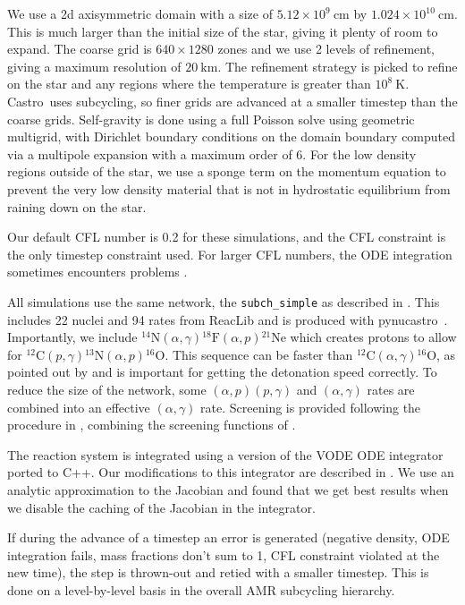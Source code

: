 \documentclass[modern]{aastex631}
\newcommand{\isotm}[2]{{}^{#2}\mathrm{#1}}
\newcommand{\castro}{{\sf Castro}}
\newcommand{\pynucastro}{{\sf pynucastro}}
\newcommand{\MarginPar}[1]{
    \marginpar{\vskip-\baselineskip%
               \raggedright%
               \tiny\sffamily%
               {\color{red}\hrule%
               \smallskip%
               #1\par%
               \smallskip%
               \hrule}}%
}
\begin{document}
We use a 2d axisymmetric domain with a size of $5.12\times 10^9~\mathrm{cm}$ by $1.024\times 10^{10}~\mathrm{cm}$.  This is
much larger than the initial size of the star, giving it plenty of
room to expand.  The coarse grid is $640\times 1280$ zones and we use
2 levels of refinement, giving a maximum resolution of
$20~\mathrm{km}$.  The refinement strategy is picked to refine on the
star and any regions where the temperature is greater than
$10^8~\mathrm{K}$.  \castro\ uses subcycling, so finer grids are
advanced at a smaller timestep than the coarse grids.  Self-gravity is
done using a full Poisson solve using geometric multigrid, with
Dirichlet boundary conditions on the domain boundary computed via a
multipole expansion with a maximum order of 6.  For the low density
regions outside of the star, we use a sponge term on the momentum
equation to prevent the very low density material that is not in
hydrostatic equilibrium from raining down on the star.

Our default CFL number is 0.2 for these simulations, and the CFL constraint
is the only timestep constraint used.  For larger CFL numbers, the ODE integration
sometimes encounters problems \MarginPar{more}.

All simulations use the same network, the {\tt subch\_simple} as
described in \cite{zhi2023}.  This includes 22 nuclei and 94 rates
from ReacLib \citep{reaclib} and is produced with \pynucastro\
\citep{pynucastro2}.  Importantly, we include
$\isotm{N}{14}(\alpha,\gamma)\isotm{F}{18}(\alpha,p)\isotm{Ne}{21}$
which creates protons to allow for
$\isotm{C}{12}(p,\gamma)\isotm{N}{13}(\alpha,p)\isotm{O}{16}$.  This
sequence can be faster than
$\isotm{C}{12}(\alpha,\gamma)\isotm{O}{16}$, as pointed out by
\citet{shenbildsten} and is important for getting the detonation speed
correctly.  To reduce the size of the network, some
$(\alpha,p)(p,\gamma)$ and $(\alpha,\gamma)$ rates are combined into
an effective $(\alpha,\gamma)$ rate.  Screening is provided following
the procedure in \citet{wallace:1982}, combining the screening
functions of \citet{graboske:1973,alastuey:1978,itoh:1979}.

The reaction system is integrated using a version of the VODE ODE integrator
\citep{vode} ported to C++.  Our modifications to this integrator are described
in \citet{castro_simple_sdc}.  We use an analytic approximation to the Jacobian
and found that we get best results when we disable the caching of the Jacobian
in the integrator.

If during the advance of a timestep an error is generated (negative
density, ODE integration fails, mass fractions don't sum to 1, CFL constraint violated at the new time), the
step is thrown-out and retied with a smaller timestep.  This is done
on a level-by-level basis in the overall AMR subcycling hierarchy.
\end{document}
